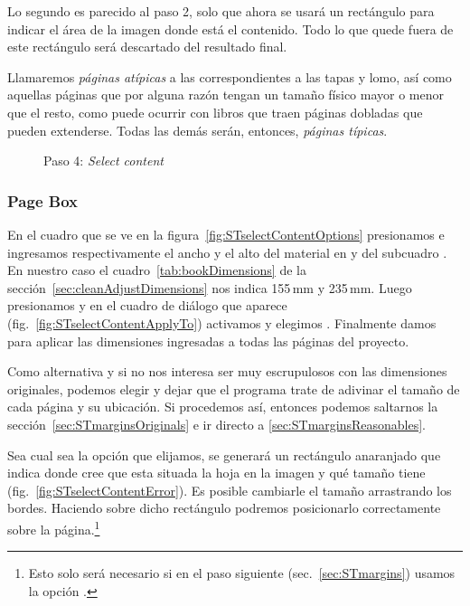 \documentclass[%
	a5paper,
	10pt,
	twoside,
	openright,
	final,
]{memoir}
\begin{document}
	Lo segundo es parecido al paso 2, solo que ahora se usará un rectángulo para indicar el área de la imagen donde está el contenido. Todo lo que quede fuera de este rectángulo será descartado del resultado final.

	 Llamaremos \emph{páginas atípicas} a las correspondientes a las tapas y lomo, así como aquellas páginas que por alguna razón tengan un tamaño físico mayor o menor que el resto, como puede ocurrir con libros que traen páginas dobladas que pueden extenderse. Todas las demás serán, entonces, \emph{páginas típicas}.

	\begin{figure}
		\centering
		\hfill
		\caption{Paso 4: \emph{Select content}\label{fig:STselectContent}}
	\end{figure}

	\subsubsection{Page Box} En el cuadro  que se ve en la figura~\ref{fig:STselectContentOptions} presionamos  e ingresamos respectivamente el ancho y el alto del material en  y  del subcuadro . En nuestro caso el cuadro~\ref{tab:bookDimensions} de la sección~\ref{sec:cleanAdjustDimensions} nos indica 155\,mm y 235\,mm. Luego presionamos  y en el cuadro de diálogo que aparece (fig.~\ref{fig:STselectContentApplyTo}) activamos  y elegimos . Finalmente damos  para aplicar las dimensiones ingresadas a todas las páginas del proyecto.

	Como alternativa y si no nos interesa ser muy escrupulosos con las dimensiones originales, podemos elegir  y dejar que el programa trate de adivinar el tamaño de cada página y su ubicación. Si procedemos así, entonces podemos saltarnos la sección~\ref{sec:STmarginsOriginals} e ir directo a \ref{sec:STmarginsReasonables}.

	Sea cual sea la opción que elijamos, se generará un rectángulo anaranjado que indica donde \scantailor cree que esta situada la hoja en la imagen y qué tamaño tiene (fig.~\ref{fig:STselectContentError}). Es posible cambiarle el tamaño arrastrando los bordes. Haciendo  sobre dicho rectángulo podremos posicionarlo correctamente sobre la página.\footnote{Esto solo será necesario si en el paso siguiente (sec.~\ref{sec:STmargins}) usamos la opción .}
\end{document}
